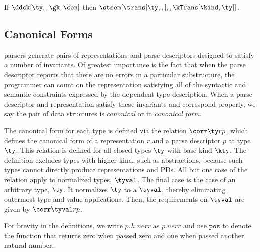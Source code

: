 \begin{theorem}
\label{thm:type-correctness}
  If $\ddck[\ty,,\gk,\con]$ then
  $\stsem[{\trans[\ty,,]},,\kTrans[\kind,\ty]]$.
\end{theorem}

\subsection{Canonical Forms}

\ddc{} parsers generate pairs of representations and parse descriptors
designed to satisfy a number of invariants.  Of greatest importance is
the fact that when the parse descriptor reports that there are no errors in a
particular substructure, the programmer can count on the
representation satisfying all of the syntactic and semantic
constraints expressed by the dependent \ddc{} type description.  When
a parse descriptor and representation satisfy these invariants and
correspond properly, we say the pair of data structures is {\em
  canonical} or in {\em canonical form}.

The canonical form for each \ddc{} type is defined via the relation $\corr \ty r p$, which
defines the canonical form of a representation $r$ and a parse
descriptor $p$ at type $\ty$.  This relation is defined for all closed types $\ty$ with base kind $\kty$.  The definition excludes
types with higher kind, such as abstractions, because such types
cannot directly produce representations and PDs.
All but one case of the relation apply to normalized types, $\tyval$. The final case is the case of an arbitrary type, $\ty$. It normalizes $\ty$ to a $\tyval$,
thereby eliminating outermost type and value applications. Then, the
requirements on $\tyval$ are given by $\corr \tyval r p$.  
\cut{
}

For brevity in the definitions, we write $p.h.{nerr}$ as $p.{nerr}$ and use $\mathtt{pos}$ to
denote the function that returns zero when passed zero and one when
passed another natural number.


